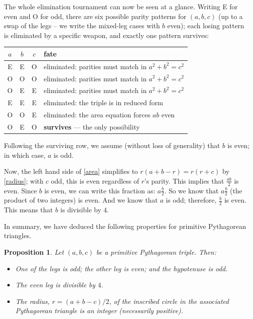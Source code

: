 \documentclass[12pt]{article}
\theoremstyle{plain}
\newtheorem{proposition}{Proposition}
\begin{document}
The whole elimination tournament can now be seen at a glance. Writing E
for even and O for odd, there are six possible parity patterns for
$(a, b, c)$ (up to a swap of the legs -- we write the mixed-leg cases with
$b$ even); each losing pattern is eliminated by a specific weapon, and
exactly one pattern survives:
\begin{center}
\begin{tabular}{ccc|l}
$a$ & $b$ & $c$ & fate \\
\hline
E & E & O & eliminated: parities must match in $a^2 + b^2 = c^2$ \\
O & O & O & eliminated: parities must match in $a^2 + b^2 = c^2$ \\
O & E & E & eliminated: parities must match in $a^2 + b^2 = c^2$ \\
E & E & E & eliminated: the triple is in reduced form \\
O & O & E & eliminated: the area equation forces $ab$ even \\
O & E & O & {\bf survives} --- the only possibility \\
\end{tabular}
\end{center}

Following the surviving row, we assume (without loss of generality) that
$b$ is even; in which case, $a$ is odd.

Now, the left hand side of \eqref{area} simplifies to
$r(a + b - r) = r(r + c)$ by \eqref{radius}; with $c$ odd, this is even
regardless of $r$'s parity. This implies that $\frac{ab}{2}$
is even. Since $b$ is even, we can write this fraction as: $a \frac{b}{2}$.
So we know that $a \frac{b}{2}$ (the product of two integers) is even.
And we know that $a$ is odd; therefore, $\frac{b}{2}$ is even.
This means that $b$ is divisible by $4$.

In summary, we have deduced the following properties for primitive Pythagorean triangles.

\begin{proposition}\label{prop:parity}
Let $(a, b, c)$ be a primitive Pythagorean triple. Then:
\begin{itemize}
  \item One of the legs is odd; the other leg is even; and the hypotenuse
      is odd.
  \item The even leg is divisible by $4$.
  \item The radius, $r = (a + b - c)/2$, of the inscribed circle in the
      associated Pythagorean triangle is an integer (necessarily positive).
\end{itemize}
\end{proposition}
\end{document}

